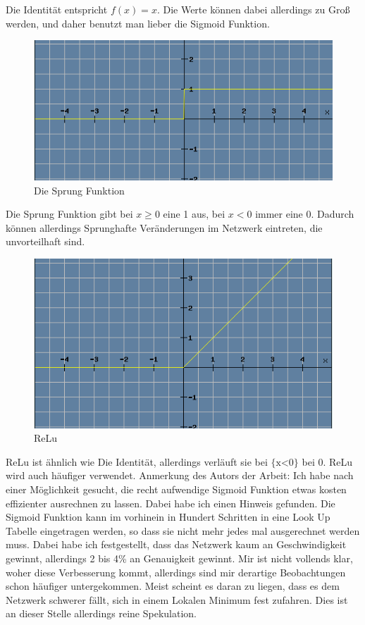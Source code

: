 \documentclass[12pt]{article}
\begin{document}
Die Identität entspricht $f(x) = x$. Die Werte können dabei allerdings zu Groß werden, und daher benutzt man lieber die Sigmoid Funktion. 
\begin{figure}[H]
\centering
\includegraphics[scale=0.60]{./Images/Pasted image 20230912195705.png}
\caption{Die Sprung Funktion}
\label{Was kommt hier rein?}\end{figure}
Die Sprung Funktion gibt bei $x \ge 0$ eine 1 aus, bei $x<0$ immer eine 0.
Dadurch können allerdings Sprunghafte Veränderungen im Netzwerk eintreten, die unvorteilhaft sind.
\begin{figure}[H]
\centering
\includegraphics[scale=0.60]{./Images/Pasted image 20230912200758.png}
\caption{ReLu}
\label{Was kommt hier rein?}\end{figure}
ReLu ist ähnlich wie Die Identität, allerdings verläuft sie bei $\text{\{x<0\}}$ bei 0.
ReLu wird auch häufiger verwendet. Anmerkung des Autors der Arbeit: Ich habe nach einer Möglichkeit gesucht, die recht aufwendige Sigmoid Funktion etwas kosten effizienter ausrechnen zu lassen. Dabei habe ich einen Hinweis gefunden. Die Sigmoid Funktion kann im vorhinein in Hundert Schritten in eine Look Up Tabelle eingetragen werden, so dass sie nicht mehr jedes mal ausgerechnet werden muss. Dabei habe ich festgestellt, dass das Netzwerk kaum an Geschwindigkeit gewinnt, allerdings 2 bis 4\% an Genauigkeit gewinnt. Mir ist nicht vollends klar, woher diese Verbesserung kommt, allerdings sind mir derartige Beobachtungen schon häufiger untergekommen. Meist scheint es daran zu liegen, dass es dem Netzwerk schwerer fällt, sich in einem Lokalen Minimum fest zufahren. Dies ist an dieser Stelle allerdings reine Spekulation.
\end{document}
